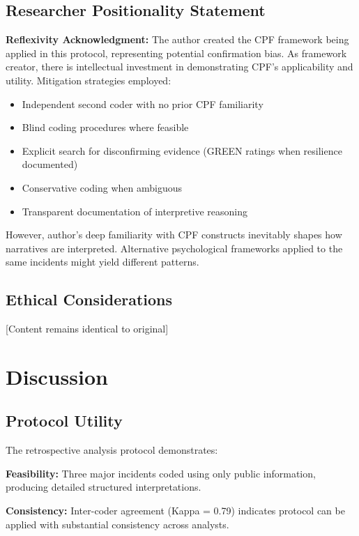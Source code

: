 \documentclass[11pt,a4paper]{article}
\begin{document}
\subsection{Researcher Positionality Statement}

\textbf{Reflexivity Acknowledgment:} The author created the CPF framework being applied in this protocol, representing potential confirmation bias. As framework creator, there is intellectual investment in demonstrating CPF's applicability and utility. Mitigation strategies employed:

\begin{itemize}
\item Independent second coder with no prior CPF familiarity
\item Blind coding procedures where feasible
\item Explicit search for disconfirming evidence (GREEN ratings when resilience documented)
\item Conservative coding when ambiguous
\item Transparent documentation of interpretive reasoning
\end{itemize}

However, author's deep familiarity with CPF constructs inevitably shapes how narratives are interpreted. Alternative psychological frameworks applied to the same incidents might yield different patterns.

\subsection{Ethical Considerations}

[Content remains identical to original]

\section{Discussion}

\subsection{Protocol Utility}

The retrospective analysis protocol demonstrates:

\textbf{Feasibility:} Three major incidents coded using only public information, producing detailed structured interpretations.

\textbf{Consistency:} Inter-coder agreement (Kappa = 0.79) indicates protocol can be applied with substantial consistency across analysts.
\end{document}
